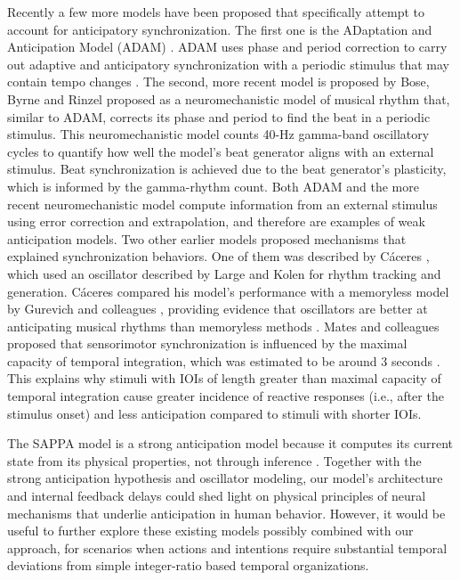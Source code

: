 \documentclass{report}
\begin{document}
Recently a few more models have been proposed that specifically attempt to account for anticipatory synchronization. The first one is the ADaptation and Anticipation Model (ADAM) \cite{van2013adaptation}. ADAM uses phase and period correction to carry out adaptive and anticipatory synchronization with a periodic stimulus that may contain tempo changes \cite{van2013adaptation}. The second, more recent model is proposed by Bose, Byrne and Rinzel \cite{bose2019neuromechanistic} proposed as a neuromechanistic model of musical rhythm that, similar to ADAM, corrects its phase and period to find the beat in a periodic stimulus. This neuromechanistic model counts 40-Hz gamma-band oscillatory cycles to quantify how well the model's beat generator aligns with an external stimulus. Beat synchronization is achieved due to the beat generator's plasticity, which is informed by the gamma-rhythm count. Both ADAM and the more recent neuromechanistic model compute information from an external stimulus using error correction and extrapolation, and therefore are examples of weak anticipation models. Two other earlier models proposed mechanisms that explained synchronization behaviors. One of them was described by C\'{a}ceres \cite{caceres2013synchronization}, which used an oscillator described by Large and Kolen \cite{large1994resonance} for rhythm tracking and generation. C\'{a}ceres compared his model's performance with a memoryless model by Gurevich and colleagues \cite{gurevish2004simulation}, providing evidence that oscillators are better at anticipating musical rhythms than memoryless methods \cite{caceres2013synchronization}. Mates and colleagues proposed that sensorimotor synchronization is influenced by the maximal capacity of temporal integration, which was estimated to be around 3 seconds \cite{mates1994temporal}. This explains why stimuli with IOIs of length greater than maximal capacity of temporal integration cause greater incidence of reactive responses (i.e., after the stimulus onset) and less anticipation compared to stimuli with shorter IOIs.

The SAPPA model is a strong anticipation model because it computes its current state from its physical properties, not through inference \cite{dubois2001incursive,stepp2010strong}. Together with the strong anticipation hypothesis and oscillator modeling, our model's architecture and internal feedback delays could shed light on physical principles of neural mechanisms that underlie anticipation in human behavior. However, it would be useful to further explore these existing models possibly combined with our approach, for scenarios when actions and intentions require substantial temporal deviations from simple integer-ratio based temporal organizations.
\end{document}
